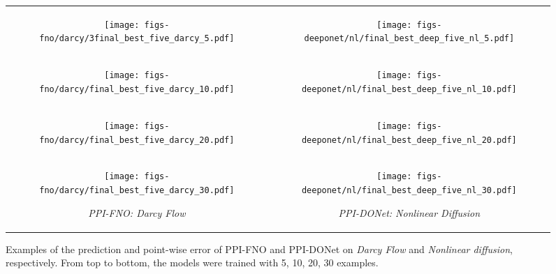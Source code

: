 \begin{figure}
	\centering
	\setlength\tabcolsep{0pt}
	\begin{tabular}[c]{cc}
	\begin{subfigure}[b]{0.48\textwidth}
		\centering
	\texttt{[image: figs-fno/darcy/3final\_best\_five\_darcy\_5.pdf]}
	\end{subfigure} &
    \begin{subfigure}[b]{0.48\textwidth}
		\centering
	\texttt{[image: 
 figs-deeponet/nl/final\_best\_deep\_five\_nl\_5.pdf]}
	\end{subfigure}
 \\
	\begin{subfigure}[b]{0.48\textwidth}
		\centering
		\texttt{[image: figs-fno/darcy/final\_best\_five\_darcy\_10.pdf]}
	\end{subfigure} &
 \begin{subfigure}[b]{0.48\textwidth}
		\centering
	\texttt{[image: figs-deeponet/nl/final\_best\_deep\_five\_nl\_10.pdf]}
	\end{subfigure}
 \\
 \begin{subfigure}[b]{0.48\textwidth}
		\centering
		\texttt{[image: figs-fno/darcy/final\_best\_five\_darcy\_20.pdf]}
	\end{subfigure} &
 \begin{subfigure}[b]{0.48\textwidth}
		\centering
	\texttt{[image: figs-deeponet/nl/final\_best\_deep\_five\_nl\_20.pdf]}
	\end{subfigure}
 \\
 \begin{subfigure}[b]{0.48\textwidth}
		\centering
	\texttt{[image: figs-fno/darcy/final\_best\_five\_darcy\_30.pdf]}
 \caption{\small \textit{PPI-FNO: Darcy Flow}}\label{fig:darcy-fno-example}
	\end{subfigure} & 
 \begin{subfigure}[b]{0.48\textwidth}
		\centering
\texttt{[image: figs-deeponet/nl/final\_best\_deep\_five\_nl\_30.pdf]}
 \caption{\small \textit{PPI-DONet: Nonlinear Diffusion}}\label{fig:nl-deeponet-example}
	\end{subfigure}
\end{tabular}
	\caption{\small Examples of the prediction and point-wise error of PPI-FNO and PPI-DONet on \textit{Darcy Flow} and \textit{Nonlinear diffusion}, respectively.  From top to bottom, the models were trained with 5, 10, 20, 30 examples.}
 
\end{figure}
